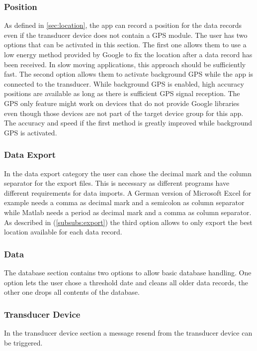 \subsubsection{Position}
As defined in \ref{sec:location}, the app can record a position for the data records even if the transducer device does not contain a GPS module. The user has two options that can be activated in this section. The first one allows them to use a low energy method provided by Google to fix the location after a data record has been received. In slow moving applications, this approach should be sufficiently fast. The second option allows them to activate background GPS while the app is connected to the transducer. While background GPS is enabled, high accuracy positions are available as long as there is sufficient GPS signal reception. The GPS only feature might work on devices that do not provide Google libraries even though those devices are not part of the target device group for this app. The accuracy and speed if the first method is greatly improved while background GPS is activated.

\subsubsection{Data Export}
In the data export category the user can chose the decimal mark and the column separator for the export files. This is necessary as different programs have different requirements for data imports. A German version of Microsoft Excel for example needs a comma as decimal mark and a semicolon as column separator while Matlab needs a period as decimal mark and a comma as column separator. As described in (\ref{subsubs:export}) the third option allows to only export the best location available for each data record.

\subsubsection{Data}
The database section contains two options to allow basic database handling. One option lets the user chose a threshold date and cleans all older data records, the other one drops all contents of the database.

\subsubsection{Transducer Device}
In the transducer device section a message resend from the transducer device can be triggered.

